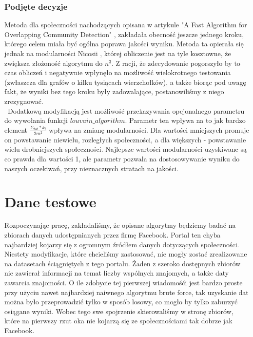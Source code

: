 \documentclass{article}
\begin{document}
\subsubsection{Podjęte decyzje}
Metoda dla społeczności nachodzących opisana w artykule "A Fast Algorithm for Overlapping Community Detection" \cite{pw-paper3}, zakładała obecność jeszcze jednego kroku, którego celem miała być ogólna poprawa jakości wyniku. Metoda ta opierała się jednak na modularności Nicosii \cite{pw-paper2}, której obliczenie jest na tyle kosztowne, że zwiększa złożoność algorytmu do $n^3$. Z racji, że zdecydowanie pogorszyło by to czas obliczeń i negatywnie wpłynęło na możliwość wielokrotnego testowania (zwłaszcza dla grafów o kilku tysiącach wierzchołków), a także biorąc pod uwagę fakt, że wyniki bez tego kroku były zadowalające, postanowiliśmy z niego zrezygnować.\\\ Dodatkową modyfikacją jest możliwość przekazywania  opcjonalnego parametru do wywołania funkcji $louvain\_ algorithm$. Parametr ten wpływa na to jak bardzo element $\frac{\Sigma_{tot}*k_i}{2m^2}$ wpływa na zmianę modularności. Dla wartości mniejszych promuje on powstawanie niewielu, rozległych społeczności, a dla większych - powstawanie wielu drobniejszych społeczności. Najlepsze wartości modularności uzyskiwane są co prawda dla wartości 1, ale parametr pozwala na dostosowywanie wyniku do naszych oczekiwań, przy nieznacznych stratach na jakości.

\section{Dane testowe}
Rozpoczynając pracę, zakładaliśmy, że opisane algorytmy będziemy badać na zbiorach danych udostępnianych przez firmę Facebook. Portal ten chyba najbardziej kojarzy się z ogromnym źródłem danych dotyczących społeczności. Niestety modyfikacje, które chcieliśmy zastosować, nie mogły zostać zrealizowane na datasetach ściągniętych z tego portalu. Żaden z szeroko dostępnych zbiorów nie zawierał informacji na temat liczby wspólnych znajomych, a także daty zawarcia znajomości. O ile zdobycie tej pierwszej wiadomośći jest bardzo proste przy użyciu nawet najbardziej naiwnego algorytmu brute force, tak uzyskanie dat można było przeprowadzić tylko w sposób losowy, co mogło by tylko zaburzyć osiągane wyniki. Wobec tego swe spojrzenie skierowaliśmy w stronę zbiorów, które na pierwszy rzut oka nie kojarzą się ze społecznościami tak dobrze jak Facebook.
\end{document}
